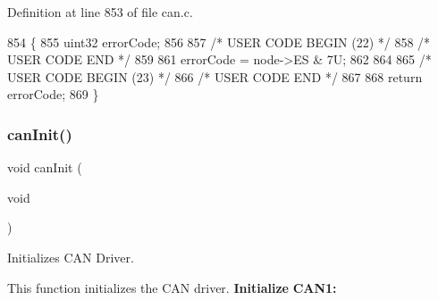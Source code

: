 Definition at line 853 of file can.\+c.


\begin{DoxyCode}
854 \{
855     uint32 errorCode;
856 
857 \textcolor{comment}{/* USER CODE BEGIN (22) */}
858 \textcolor{comment}{/* USER CODE END */}
859 
861     errorCode = node->ES & 7U;
862 
864 
865 \textcolor{comment}{/* USER CODE BEGIN (23) */}
866 \textcolor{comment}{/* USER CODE END */}
867 
868     \textcolor{keywordflow}{return} errorCode;
869 \}
\end{DoxyCode}
\mbox{\label{group__CAN_ga2d3efc34f7704ab23c293aac2be47764}} 
\subsubsection{\texorpdfstring{can\+Init()}{canInit()}}
{\footnotesize\ttfamily void can\+Init (\begin{DoxyParamCaption}\item[{void}]{ }\end{DoxyParamCaption})}



Initializes C\+AN Driver. 

This function initializes the C\+AN driver. {\bfseries Initialize} {\bfseries C\+A\+N1\+:} ~\newline
~\newline
~\newline
~\newline
~\newline
~\newline
~\newline
~\newline
~\newline
~\newline

